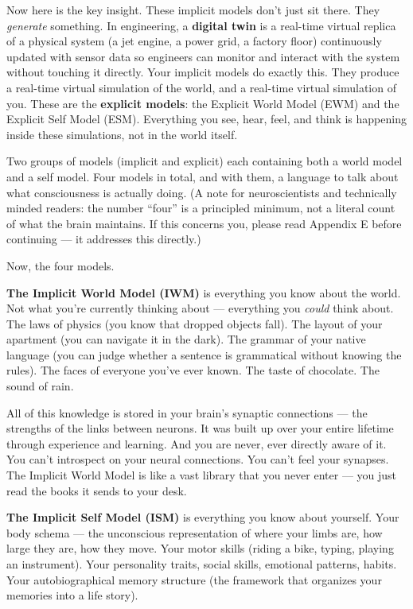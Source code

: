 \documentclass[11pt, twoside, openright]{book}
\begin{document}
Now here is the key insight. These implicit models don't just sit there. They \textit{generate} something. In engineering, a \textbf{digital twin} is a real-time virtual replica of a physical system (a jet engine, a power grid, a factory floor) continuously updated with sensor data so engineers can monitor and interact with the system without touching it directly. Your implicit models do exactly this. They produce a real-time virtual simulation of the world, and a real-time virtual simulation of you. These are the \textbf{explicit models}: the Explicit World Model (EWM) and the Explicit Self Model (ESM). Everything you see, hear, feel, and think is happening inside these simulations, not in the world itself.

Two groups of models (implicit and explicit) each containing both a world model and a self model. Four models in total, and with them, a language to talk about what consciousness is actually doing. (A note for neuroscientists and technically minded readers: the number ``four'' is a principled minimum, not a literal count of what the brain maintains. If this concerns you, please read Appendix E before continuing --- it addresses this directly.)

Now, the four models.

\textbf{The Implicit World Model (IWM)} is everything you know about the world. Not what you're currently thinking about --- everything you \textit{could} think about. The laws of physics (you know that dropped objects fall). The layout of your apartment (you can navigate it in the dark). The grammar of your native language (you can judge whether a sentence is grammatical without knowing the rules). The faces of everyone you've ever known. The taste of chocolate. The sound of rain.

All of this knowledge is stored in your brain's synaptic connections --- the strengths of the links between neurons. It was built up over your entire lifetime through experience and learning. And you are never, ever directly aware of it. You can't introspect on your neural connections. You can't feel your synapses. The Implicit World Model is like a vast library that you never enter --- you just read the books it sends to your desk.

\textbf{The Implicit Self Model (ISM)} is everything you know about yourself. Your body schema --- the unconscious representation of where your limbs are, how large they are, how they move. Your motor skills (riding a bike, typing, playing an instrument). Your personality traits, social skills, emotional patterns, habits. Your autobiographical memory structure (the framework that organizes your memories into a life story).
\end{document}
